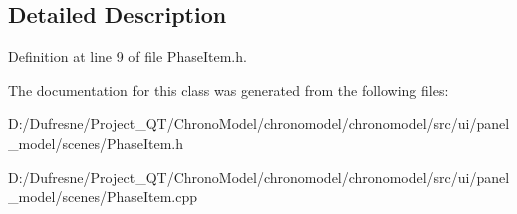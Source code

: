 \subsection{Detailed Description}


Definition at line 9 of file Phase\-Item.\-h.



The documentation for this class was generated from the following files\-:\begin{DoxyCompactItemize}
\item 
D\-:/\-Dufresne/\-Project\-\_\-\-Q\-T/\-Chrono\-Model/chronomodel/chronomodel/src/ui/panel\-\_\-model/scenes/Phase\-Item.\-h\item 
D\-:/\-Dufresne/\-Project\-\_\-\-Q\-T/\-Chrono\-Model/chronomodel/chronomodel/src/ui/panel\-\_\-model/scenes/Phase\-Item.\-cpp\end{DoxyCompactItemize}
